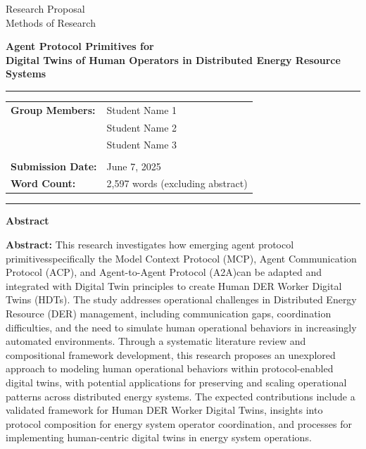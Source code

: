 \documentclass[12pt,a4paper]{article}
\newcommand{\studentone}{Student Name 1}
\newcommand{\studenttwo}{Student Name 2}
\newcommand{\studentthree}{Student Name 3}
\newcommand{\projecttitle}{Agent Protocol Primitives for \\Digital Twins of Human Operators in Distributed Energy Resource Systems}
\newcommand{\submissiondate}{June 7, 2025}
\newcommand{\emdash}{\textemdash}
\begin{document}
\begin{titlepage}
\begin{center}
{\Huge Research Proposal} \\
\vspace{5mm}
{\Large Methods of Research} \\

\vspace{10mm}

{\huge\textbf{\projecttitle}} \\

\vspace{15mm}

\hrule
\vspace{3mm}
\begin{tabular}{ll}
\textbf{Group Members:} & {\studentone} \\
& {\studenttwo} \\
& {\studentthree} \\
\\
\textbf{Submission Date:} & {\submissiondate} \\
\textbf{Word Count:} & 2,597 words (excluding abstract) \\
\end{tabular}
\vspace{3mm}
\hrule

\vspace{15mm}

\textbf{Abstract} \\
\vspace{2mm}
\begin{minipage}{0.8\textwidth}
\textbf{Abstract:} This research investigates how emerging agent protocol primitives\emdash{}specifically the Model Context Protocol (MCP), Agent Communication Protocol (ACP), and Agent-to-Agent Protocol (A2A)\emdash{}can be adapted and integrated with Digital Twin principles to create Human DER Worker Digital Twins (HDTs). The study addresses operational challenges in Distributed Energy Resource (DER) management, including communication gaps, coordination difficulties, and the need to simulate human operational behaviors in increasingly automated environments. Through a systematic literature review and compositional framework development, this research proposes an unexplored approach to modeling human operational behaviors within protocol-enabled digital twins, with potential applications for preserving and scaling operational patterns across distributed energy systems. The expected contributions include a validated framework for Human DER Worker Digital Twins, insights into protocol composition for energy system operator coordination, and processes for implementing human-centric digital twins in energy system operations.
\end{minipage}

\end{center}
\end{titlepage}
\end{document}

